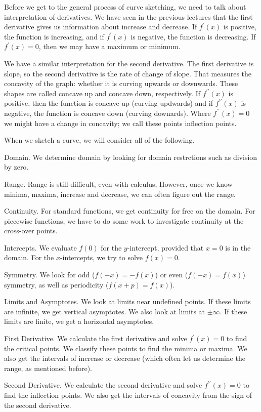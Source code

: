 \documentclass[fleqn]{report}
\begin{document}
Before we get to the general process of curve sketching, we
need to talk about interpretation of derivatives. We have
seen in the previous lectures that the first derivative gives
us information about increase and decrease. If $f^\prime(x)$
is positive, the function is increasing, and if $f^\prime(x)$
is negative, the function is decreasing. If $f^\prime(x) =
0$, then we may have a maximum or minimum.

We have a similar interpretation for the second derivative.
The first derivative is slope, so the second derivative is the
rate of change of slope. That measures the concavity of the
graph: whether it is curving upwards or downwards. These
shapes are called concave up and concave down, respectively.
If $f^{\prime \prime}(x)$ is positive, then the function is
concave up (curving updwards) and if $f^{\prime \prime}(x)$ is
negative, the function is concave down (curving downards).
Where $f^{\prime \prime}(x) = 0$ we might have a change in
concavity; we call these points inflection points.

When we sketch a curve, we will consider all of the following.

\begin{smallparts}
\item Domain. We determine domain by looking for domain
restrctions such as division by zero.
\item Range. Range is still difficult, even with calculus,
However, once we know minima, maxima, increase and decrease,
we can often figure out the range.
\item Continuity. For standard functions, we get continuity
for free on the domain. For piecewise functions, we have to
do some work to investigate continuity at the cross-over
points.
\item Intercepts. We evaluate $f(0)$ for the
$y$-intercept, provided that $x=0$ is in the domain. For the
$x$-intercepts, we try to solve $f(x) = 0$.
\item Symmetry. We look for odd ($f(-x) = -f(x)$) or even
($f(-x) = f(x)$) symmetry, as well as periodicity ($f(x+p) =
f(x)$).
\item Limits and Asymptotes. We look at limits near undefined
points. If these limits are infinite, we get vertical
asymptotes. We also look at limits at $\pm \infty$. If these
limits are finite, we get a horizontal asymptotes.
\item First Derivative. We calculate the first derivative and
solve $f^\prime(x) =0$ to find the critical points. We
classify these points to find the minima or maxima. We also
get the intervals of increase or decrease (which often let us
determine the range, as mentioned before).
\item Second Derivative. We calculate the second derivative
and solve $f^{\prime \prime}(x) = 0$ to find the inflection
points. We also get the intervals of concavity from the sign
of the second derivative.
\end{smallparts}
\end{document}
